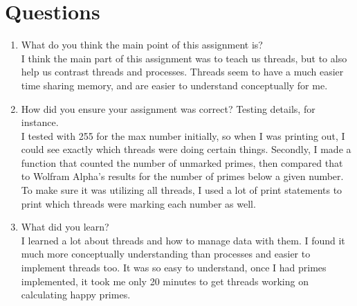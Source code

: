 \documentclass[fleqn,10pt,titlepage]{article}
\begin{document}
\section{Questions}
\begin{enumerate}
\item What do you think the main point of this assignment is? \\ I think the main part of this
assignment was to teach us threads, but to also help us contrast threads and processes. Threads
seem to have a much easier time sharing memory, and are easier to understand conceptually for me.
\item How did you ensure your assignment was correct? Testing details, for instance. \\ I 
tested with 255 for the max number initially, so when I was printing out, I could see exactly
which threads were doing certain things. Secondly, I made a function that counted the number of
unmarked primes, then compared that to Wolfram Alpha's results for the number of primes below a
given number. To make sure it was utilizing all threads, I used a lot of print statements to
print which threads were marking each number as well.
\item What did you learn? \\ I learned a lot about threads and how to manage data with them.
I found it much more conceptually understanding than processes and easier to implement threads
too. It was so easy to understand, once I had primes implemented, it took me only 20
minutes to get threads working on calculating happy primes.
\end{enumerate}
\end{document}
